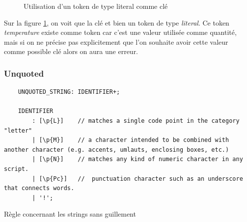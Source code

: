 \documentclass[
    iict, %
    il, %
]{heig-tb}
\begin{document}
\begin{figure}[!h]
    \begin{center}
    \end{center}
    \caption[Utilisation d'un token de type literal comme clé]{\label{literal-key-uon}Utilisation d'un token de type literal comme clé}
\end{figure}

Sur la figure \ref{literal-key-uon}, on voit que la clé et bien un token de type \emph{literal}.
Ce token \emph{temperature} existe comme token car c'est une valeur utilisée comme quantité, mais si on ne précise pas explicitement que l'on souhaite avoir cette valeur
comme possible clé alors on aura une erreur.

\subsubsection{Unquoted}

\begin{listing}[!ht]
    \begin{verbatim}
    UNQUOTED_STRING: IDENTIFIER+;

    IDENTIFIER
        : [\p{L}]    // matches a single code point in the category "letter"
        | [\p{M}]    // a character intended to be combined with another character (e.g. accents, umlauts, enclosing boxes, etc.)
        | [\p{N}]    // matches any kind of numeric character in any script.
        | [\p{Pc}]   //  punctuation character such as an underscore that connects words.
        | '!';
    \end{verbatim}
    \caption{Règle concernant les strings sans guillement}
    \label{unquoted-rule}
\end{listing}
\end{document}
